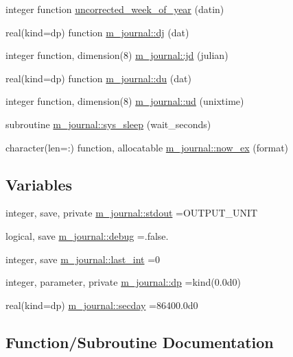 \begin{DoxyCompactItemize}
\item 
integer function \mbox{\hyperlink{M__journal_8f90_a41382743ce1b42e02a3f42146e3fa53f}{uncorrected\+\_\+week\+\_\+of\+\_\+year}} (datin)
\item 
real(kind=dp) function \mbox{\hyperlink{namespacem__journal_a649265e689819cb284a82eb80c49df49}{m\+\_\+journal\+::dj}} (dat)
\item 
integer function, dimension(8) \mbox{\hyperlink{namespacem__journal_a1e8e57f466830af519edad2004176fbc}{m\+\_\+journal\+::jd}} (julian)
\item 
real(kind=dp) function \mbox{\hyperlink{namespacem__journal_a1736ec58cd905293782a2663df69bc89}{m\+\_\+journal\+::du}} (dat)
\item 
integer function, dimension(8) \mbox{\hyperlink{namespacem__journal_abfa78dcc463f8fcdffe0b259df2f4c92}{m\+\_\+journal\+::ud}} (unixtime)
\item 
subroutine \mbox{\hyperlink{namespacem__journal_aaa9769d86a12f3f850e425991c8bcff7}{m\+\_\+journal\+::sys\+\_\+sleep}} (wait\+\_\+seconds)
\item 
character(len=\+:) function, allocatable \mbox{\hyperlink{namespacem__journal_a9c8074667748f2685122f2b3147e61d5}{m\+\_\+journal\+::now\+\_\+ex}} (format)
\end{DoxyCompactItemize}
\subsection*{Variables}
\begin{DoxyCompactItemize}
\item 
integer, save, private \mbox{\hyperlink{namespacem__journal_a664cf3fd85385b776d30ea589606ad1c}{m\+\_\+journal\+::stdout}} =O\+U\+T\+P\+U\+T\+\_\+\+U\+N\+IT
\item 
logical, save \mbox{\hyperlink{namespacem__journal_a6184fbcebdfa06f0a45ce4c699189b53}{m\+\_\+journal\+::debug}} =.false.
\item 
integer, save \mbox{\hyperlink{namespacem__journal_a47e8e34dc4072b04101027394d688519}{m\+\_\+journal\+::last\+\_\+int}} =0
\item 
integer, parameter, private \mbox{\hyperlink{namespacem__journal_aaae0522a70bb76a85ea800670d5fec5f}{m\+\_\+journal\+::dp}} =kind(0.\+0d0)
\item 
real(kind=dp) \mbox{\hyperlink{namespacem__journal_aa6eaee3a08e2f478f696f278bad54df8}{m\+\_\+journal\+::secday}} =86400.\+0d0
\end{DoxyCompactItemize}


\subsection{Function/\+Subroutine Documentation}
\mbox{\label{M__journal_8f90_a41382743ce1b42e02a3f42146e3fa53f}} 
